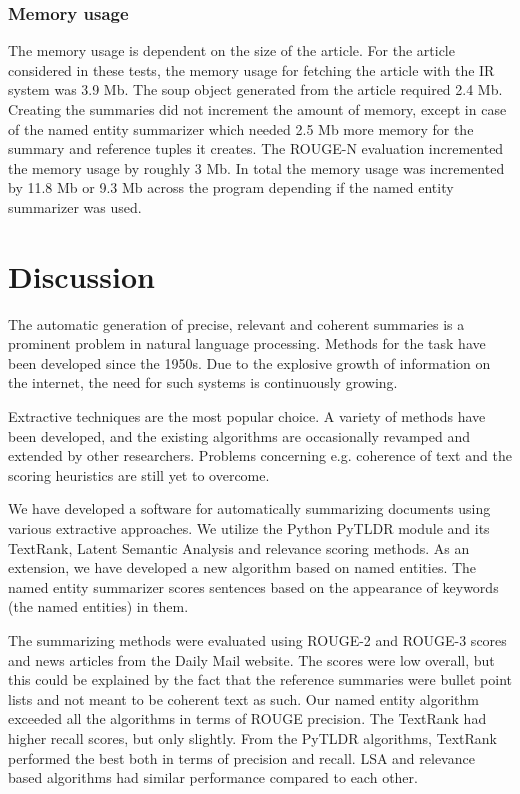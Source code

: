\documentclass[conference]{IEEEtran}
\begin{document}
\subsubsection{Memory usage}

The memory usage is dependent on the size of the article. For the article considered in these tests, the memory usage for fetching the article with the IR system was 3.9 Mb. The soup object generated from the article required 2.4 Mb. Creating the summaries did not increment the amount of memory, except in case of the named entity summarizer which needed 2.5 Mb more memory for the summary and reference tuples it creates. The ROUGE-N evaluation incremented the memory usage by roughly 3 Mb. In total the memory usage was incremented by 11.8 Mb or 9.3 Mb across the program depending if the named entity summarizer was used.


\section{Discussion}\label{discussion}
The automatic generation of precise, relevant and coherent summaries is a prominent problem in natural language processing. Methods for the task have been developed since the 1950s. Due to the explosive growth of information on the internet, the need for such systems is continuously growing. 

Extractive techniques are the most popular choice. A variety of methods have been developed, and the existing algorithms are occasionally revamped and extended by other researchers. Problems concerning e.g. coherence of text and the scoring heuristics are still yet to overcome.

We have developed a software for automatically summarizing documents using various extractive approaches. We utilize the Python PyTLDR module and its TextRank, Latent Semantic Analysis and relevance scoring methods. As an extension, we have developed a new algorithm based on named entities. The named entity summarizer scores sentences based on the appearance of keywords (the named entities) in them.

The summarizing methods were evaluated using ROUGE-2 and ROUGE-3 scores and news articles from the Daily Mail website. The scores were low overall, but this could be explained by the fact that the reference summaries were bullet point lists and not meant to be coherent text as such. Our named entity algorithm exceeded all the algorithms in terms of ROUGE precision. The TextRank had higher recall scores, but only slightly. From the PyTLDR algorithms, TextRank performed the best both in terms of precision and recall. LSA and relevance based algorithms had similar performance compared to each other.
\end{document}
